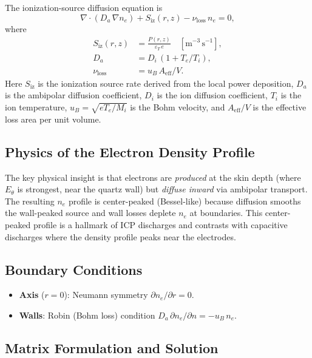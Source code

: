 \documentclass[11pt,a4paper]{report}
\newcommand{\Te}{T_e}
\begin{document}
The ionization-source diffusion equation is
\begin{equation}
  \boxed{\nabla \cdot (D_a\,\nabla n_e) + S_\mathrm{iz}(r,z) - \nu_\mathrm{loss}\,n_e = 0,}
  \label{eq:ne-diffusion}
\end{equation}
where
\begin{align}
  S_\mathrm{iz}(r,z) &= \frac{P(r,z)}{\varepsilon_T\,e} \quad [\mathrm{m}^{-3}\,\mathrm{s}^{-1}], \label{eq:S-iz} \\
  D_a &= D_i\,(1 + \Te/T_i), \label{eq:D-a} \\
  \nu_\mathrm{loss} &= u_B\,A_\mathrm{eff}/V. \label{eq:nu-loss}
\end{align}
Here $S_\mathrm{iz}$ is the ionization source rate derived from the local power deposition, $D_a$ is the ambipolar diffusion coefficient, $D_i$ is the ion diffusion coefficient, $T_i$ is the ion temperature, $u_B = \sqrt{e\Te/M_i}$ is the Bohm velocity, and $A_\mathrm{eff}/V$ is the effective loss area per unit volume.

\subsection{Physics of the Electron Density Profile}

The key physical insight is that electrons are \emph{produced} at the skin depth (where $E_\theta$ is strongest, near the quartz wall) but \emph{diffuse inward} via ambipolar transport.  The resulting $n_e$ profile is center-peaked (Bessel-like) because diffusion smooths the wall-peaked source and wall losses deplete $n_e$ at boundaries.  This center-peaked profile is a hallmark of ICP discharges and contrasts with capacitive discharges where the density profile peaks near the electrodes.

\subsection{Boundary Conditions}

\begin{itemize}
  \item \textbf{Axis} ($r = 0$): Neumann symmetry $\partial n_e/\partial r = 0$.
  \item \textbf{Walls}: Robin (Bohm loss) condition $D_a\,\partial n_e/\partial n = -u_B\,n_e$.
\end{itemize}

\subsection{Matrix Formulation and Solution}
\end{document}
